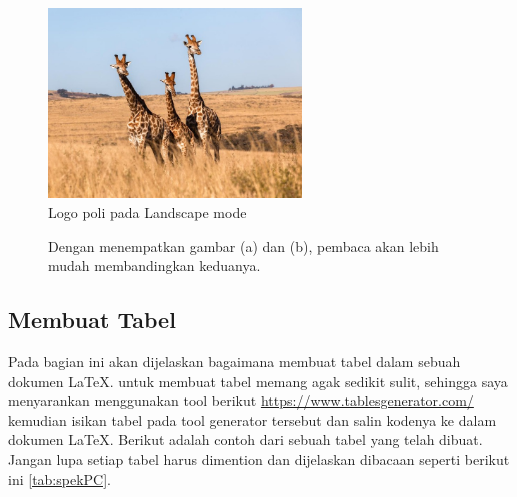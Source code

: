 \begin{figure}
	\centering
	\includegraphics[width=0.6\textwidth]{Gambar/jerapahh.jpeg}
	\caption{Logo poli pada Landscape mode}
    \label{fig:logopolilandscape}
\end{figure}

\begin{figure}[H]
    \centering
    \hspace{0.1\linewidth}
    \caption{Dengan menempatkan gambar (a) dan (b), pembaca akan lebih mudah membandingkan keduanya.}
    \label{fig:kucingdanpoli}
\end{figure}

\subsection{Membuat Tabel}
Pada bagian ini akan dijelaskan bagaimana membuat tabel dalam sebuah dokumen \LaTeX. untuk membuat tabel memang agak sedikit sulit, sehingga saya menyarankan menggunakan tool berikut \url{https://www.tablesgenerator.com/} kemudian isikan tabel pada tool generator tersebut dan salin kodenya ke dalam dokumen \LaTeX. Berikut adalah contoh dari sebuah tabel yang telah dibuat. Jangan lupa setiap tabel harus dimention dan dijelaskan dibacaan seperti berikut ini \cref{tab:spekPC}.


